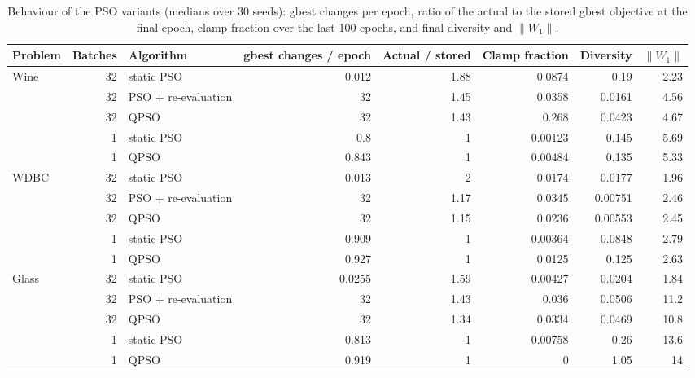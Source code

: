 \begin{table}[t]
\centering
\caption{Behaviour of the PSO variants (medians over 30 seeds): gbest changes per epoch, ratio of the actual to the stored gbest objective at the final epoch, clamp fraction over the last 100 epochs, and final diversity and $\|W_1\|$.}
\label{tab:behaviour}
\begin{tabular}{lrlrrrrr}
\toprule
Problem & Batches & Algorithm & gbest changes / epoch & Actual / stored & Clamp fraction & Diversity & $\|W_1\|$ \\
\midrule
Wine & 32 & static PSO & 0.012 & 1.88 & 0.0874 & 0.19 & 2.23 \\
 & 32 & PSO + re-evaluation & 32 & 1.45 & 0.0358 & 0.0161 & 4.56 \\
 & 32 & QPSO & 32 & 1.43 & 0.268 & 0.0423 & 4.67 \\
 & 1 & static PSO & 0.8 & 1 & 0.00123 & 0.145 & 5.69 \\
 & 1 & QPSO & 0.843 & 1 & 0.00484 & 0.135 & 5.33 \\
\midrule
WDBC & 32 & static PSO & 0.013 & 2 & 0.0174 & 0.0177 & 1.96 \\
 & 32 & PSO + re-evaluation & 32 & 1.17 & 0.0345 & 0.00751 & 2.46 \\
 & 32 & QPSO & 32 & 1.15 & 0.0236 & 0.00553 & 2.45 \\
 & 1 & static PSO & 0.909 & 1 & 0.00364 & 0.0848 & 2.79 \\
 & 1 & QPSO & 0.927 & 1 & 0.0125 & 0.125 & 2.63 \\
\midrule
Glass & 32 & static PSO & 0.0255 & 1.59 & 0.00427 & 0.0204 & 1.84 \\
 & 32 & PSO + re-evaluation & 32 & 1.43 & 0.036 & 0.0506 & 11.2 \\
 & 32 & QPSO & 32 & 1.34 & 0.0334 & 0.0469 & 10.8 \\
 & 1 & static PSO & 0.813 & 1 & 0.00758 & 0.26 & 13.6 \\
 & 1 & QPSO & 0.919 & 1 & 0 & 1.05 & 14 \\
\bottomrule
\end{tabular}
\end{table}
